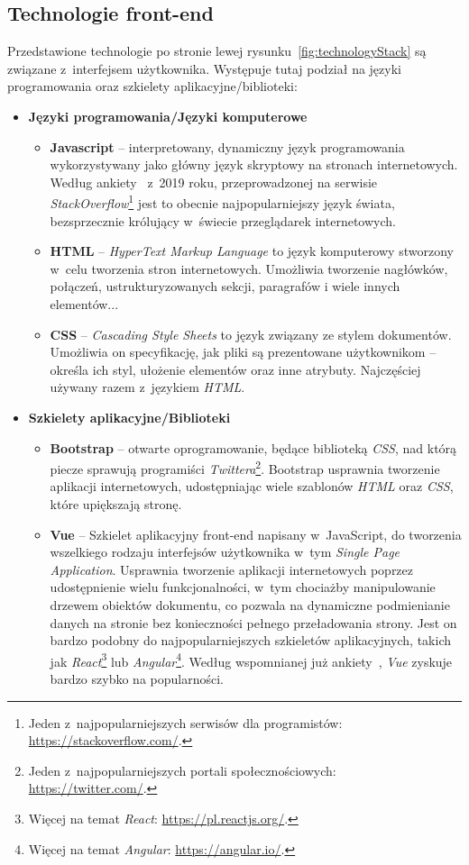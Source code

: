 \subsection{Technologie front-end}
\label{sec:frontEndTechnologie}
Przedstawione technologie po stronie lewej rysunku~\ref{fig:technologyStack} są związane z~interfejsem użytkownika. Występuje tutaj podział na języki programowania oraz szkielety aplikacyjne/biblioteki:
\begin{itemize}
    \item \textbf{Języki programowania/Języki komputerowe}
    \begin{itemize}
        \item \textbf{Javascript} -- interpretowany, dynamiczny język programowania wykorzystywany jako główny język skryptowy na stronach internetowych. Według ankiety~\cite{StackSurvey} z~2019 roku, przeprowadzonej na serwisie \emph{StackOverflow}\footnote{Jeden z~najpopularniejszych serwisów dla programistów: \url{https://stackoverflow.com/}.} jest to obecnie najpopularniejszy język świata, bezsprzecznie królujący w~świecie przeglądarek internetowych.
        \item \textbf{HTML} -- \emph{HyperText Markup Language} to język komputerowy stworzony w~celu tworzenia stron internetowych. Umożliwia tworzenie nagłówków, połączeń, ustrukturyzowanych sekcji, paragrafów i wiele innych elementów...
        \item \textbf{CSS} -- \emph{Cascading Style Sheets} to język związany ze stylem dokumentów. Umożliwia on specyfikację, jak pliki są prezentowane użytkownikom -- określa ich styl, ułożenie elementów oraz inne atrybuty. Najczęściej używany razem z~językiem \emph{HTML}. 
    \end{itemize}
    \newpage
    \item \textbf{Szkielety aplikacyjne/Biblioteki}
    \begin{itemize}
        \item \textbf{Bootstrap} -- otwarte oprogramowanie, będące biblioteką \emph{CSS}, nad którą piecze sprawują programiści \emph{Twittera}\footnote{Jeden z~najpopularniejszych portali społecznościowych: \url{https://twitter.com/}.}. Bootstrap usprawnia tworzenie aplikacji internetowych, udostępniając wiele szablonów \emph{HTML} oraz \emph{CSS}, które upiększają stronę.
        \item  \textbf{Vue} -- Szkielet aplikacyjny front-end napisany w~JavaScript, do tworzenia wszelkiego rodzaju interfejsów użytkownika w~tym \emph{Single Page Application}. Usprawnia tworzenie aplikacji internetowych poprzez udostępnienie wielu funkcjonalności, w~tym chociażby manipulowanie drzewem obiektów dokumentu, co pozwala na dynamiczne podmienianie danych na stronie bez konieczności pełnego przeładowania strony. Jest on bardzo podobny do najpopularniejszych szkieletów aplikacyjnych, takich jak \emph{React}\footnote{Więcej na temat \emph{React}: \url{https://pl.reactjs.org/}.} lub \emph{Angular}\footnote{Więcej na temat \emph{Angular}: \url{https://angular.io/}.}. Według wspomnianej już ankiety~\cite{StackSurvey}, \emph{Vue} zyskuje bardzo szybko na popularności.  
    \end{itemize}
\end{itemize}

